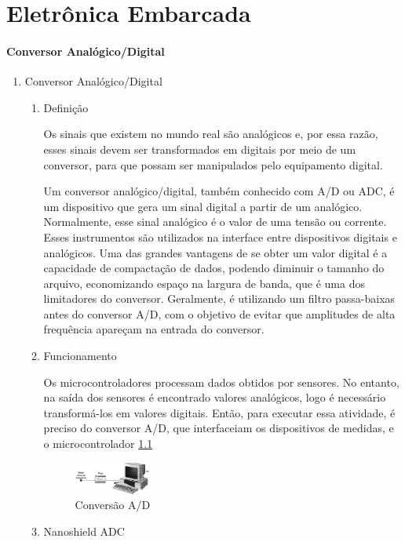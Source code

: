 \chapter{Eletrônica Embarcada}

\subsubsection{Conversor Analógico/Digital}

\begin{enumerate}
  \item Conversor Analógico/Digital
  \begin{enumerate}
    \item Definição

    Os sinais que existem no mundo real são analógicos e, por essa razão, esses sinais devem ser transformados em digitais por meio de um conversor, para que possam ser manipulados pelo equipamento digital.

    Um conversor analógico/digital, também conhecido com A/D ou ADC, é um dispositivo que gera um sinal digital a partir de um analógico. Normalmente, esse sinal analógico é o valor de uma tensão ou corrente. Esses instrumentos são utilizados na interface entre dispositivos digitais e analógicos. Uma das grandes vantagens de se obter um valor digital é a capacidade de compactação de dados, podendo diminuir o tamanho do arquivo, economizando espaço na largura de banda, que é uma dos limitadores do conversor. Geralmente, é utilizando um filtro passa-baixas antes do conversor A/D, com o objetivo de evitar que amplitudes de alta frequência apareçam na entrada do conversor.

    \item Funcionamento

    Os microcontroladores processam dados obtidos por sensores. No entanto, na saída dos sensores é encontrado valores analógicos, logo é necessário transformá-los em valores digitais. Então, para executar essa atividade, é preciso do conversor A/D, que interfaceiam os dispositivos de medidas, e o microcontrolador \ref{fig:conversorAD}

    \begin{figure}[h]
      \centering
      \includegraphics[width=0.25\textwidth]{figuras/conversorAD}
      \caption{Conversão A/D}
      \label{fig:conversorAD}
    \end{figure}

    \item Nanoshield ADC
  \end{enumerate}
\end{enumerate}

